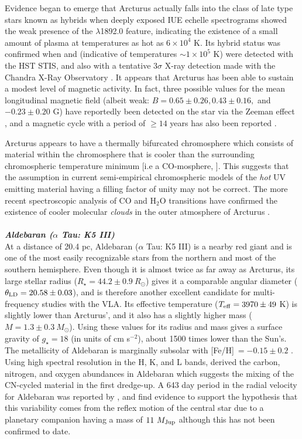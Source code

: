 Evidence began to emerge that Arcturus actually falls into the class of late type stars known as hybrids when deeply exposed IUE echelle spectrograms showed the weak presence of the \ion{Si}{iii]} $\lambda$1892.0 feature, indicating the existence of a small amount of plasma at temperatures as hot as $6 \times 10^4$ K. Its hybrid status was confirmed when  and  (indicative of temperatures $\sim 1 \times 10^5$ K) were detected with the HST STIS, and also with a tentative $3 \sigma$ X-ray detection made with the  Chandra X-Ray Observatory \citep{ayres_2003}. It appears that Arcturus has been able to sustain a modest level of magnetic activity. In fact, three possible values for the mean longitudinal magnetic field (albeit weak: $B = 0.65 \pm 0.26, 0.43 \pm 0.16,$ and $-0.23 \pm 0.20$ G) have reportedly been detected on the star via the Zeeman effect \citep{sennhauser_2011}, and a magnetic cycle with a period of $\geq 14$ years has also been reported \citep{brown_2008}.

Arcturus appears to have a thermally bifurcated chromosphere which consists of material within the chromosphere that is cooler than the surrounding chromospheric temperature minimum [i.e a CO-mosphere, \cite{wiedemann_1994}]. This suggests that the assumption in current semi-empirical chromospheric models of the \textit{hot} UV emitting material having a filling factor of unity may not be correct. The more recent spectroscopic analysis of CO and H$_{2}$O transitions have confirmed the existence of cooler molecular \textit{clouds} in the outer atmosphere of Arcturus \citep{ryde_2002,tsuji_2009}. 
\\
\\
\textbf{\textit{Aldebaran ($\alpha$ Tau: K5 III)}}\\
At a distance of 20.4 pc, Aldebaran ($\alpha$ Tau: K5 III) is a nearby red giant and is one of the most easily recognizable stars from the northern and most of the southern hemisphere. Even though it is almost twice as far away as Arcturus, its large stellar radius ($R_{\star}=44.2 \pm 0.9 \ R_{\odot}$) gives it a comparable angular diameter ($\theta _{\rm{LD}}=20.58\pm0.03$), and is therefore another excellent candidate for multi-frequency studies with the VLA. Its effective temperature ($T_{\rm{eff}}=3970 \pm 49$ K) is slightly lower than Arcturus', and it also has a slightly higher mass ($M=1.3 \pm 0.3 \ M_{\odot}$). Using these values for its radius and mass gives a surface gravity of $g_{\star}= 18$ (in units of cm s$^{-2}$), about 1500 times lower than the Sun's. The metallicity of Aldebaran is marginally subsolar with [Fe/H]$\ = - 0.15 \pm 0.2$ \citep{decin_2003}. Using high spectral resolution in the H, K, and L bands, \cite{tsuji_2008} derived the carbon, nitrogen, and oxygen abundances in Aldebaran which suggests the mixing of the CN-cycled material in the first dredge-up. A 643 day period in the radial velocity for Aldebaran was reported by \cite{hatzes_1993}, and \cite{hatzes_1998} find evidence to support the hypothesis that this variability comes from the reflex motion of the central star due to a planetary companion having a mass of $11 \ M_{\rm{Jup}}$ although this has not been confirmed to date.

